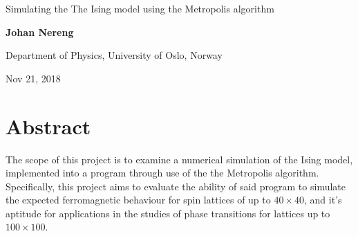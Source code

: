 \documentclass[%
oneside,                 %
final,                   %
10pt]{article}
\begin{document}

\newcommand{\exercisesection}[1]{\subsection*{#1}}






\thispagestyle{empty}

\begin{center}
{\LARGE\bf
\begin{spacing}{1.25}
Simulating the The Ising model using the Metropolis algorithm
\end{spacing}
}
\end{center}


\begin{center}
{\bf Johan Nereng}
\end{center}

    \begin{center}
\centerline{{\small Department of Physics, University of Oslo, Norway}}
\end{center}
    

\begin{center}
Nov 21, 2018
\end{center}

\vspace{1cm}

\section{Abstract}
The scope of this project is to examine a numerical simulation of the Ising model, implemented into a program through use of the the Metropolis algorithm. Specifically, this project aims to evaluate the ability of said program to simulate the expected ferromagnetic behaviour for spin lattices of up to $40 \times 40$, and it's aptitude for applications in the studies of phase transitions for lattices up to $100 \times 100$. \newline
\end{document}
